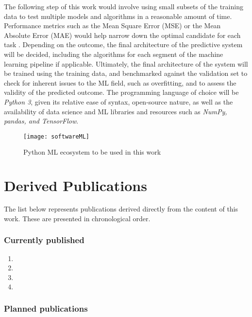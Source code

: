 \documentclass[main.tex]{subfiles}
\begin{document}
The following step of this work would involve using small subsets of the training data to test multiple models and algorithms in a reasonable amount of time. Performance metrics such as the Mean Square Error (MSE) or the Mean Absolute Error (MAE) would help narrow down the optimal candidate for each task \cite{Geron2019}. Depending on the outcome, the final architecture of the predictive system will be decided, including the algorithms for each segment of the machine learning pipeline if applicable. Ultimately, the final architecture of the system will be trained using the training data, and benchmarked against the validation set to check for inherent issues to the ML field, such as overfitting, and to assess the validity of the predicted outcome. The programming language of choice will be \emph{Python 3}, given its relative ease of syntax, open-source nature, as well as the availability of data science and ML libraries and resources such as \emph{NumPy, pandas, and TensorFlow}.

\begin{figure}[!htbp]
	\center
	\texttt{[image: softwareML]}
	\caption{Python ML ecosystem to be used in this work} \label{fig:python}
\end{figure} 

\section{Derived Publications}

The list below represents publications derived directly from the content of this work. These are presented in chronological order.

\subsubsection{Currently published}
\begin{enumerate}
	\item {}
	\item {}
	\item {}
	\item {}
\end{enumerate}

\subsubsection{Planned publications}
\end{document}
